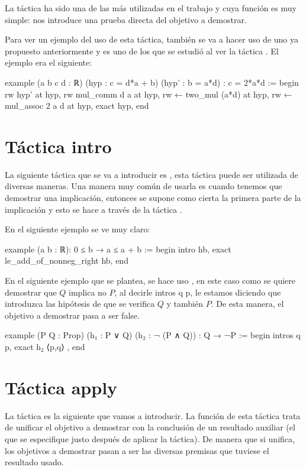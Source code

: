 La táctica  ha sido una de las más utilizadas en
el trabajo y cuya función es muy simple: nos introduce una prueba
directa del objetivo a demostrar.

Para ver un ejemplo del uso de esta táctica, también se va a hacer uso
de uno ya propuesto anteriormente y es uno de los que se estudió al ver
la táctica . El ejemplo era el siguiente:

\begin{leancode}
example (a b c d : ℝ) (hyp : c = d*a + b) (hyp' : b = a*d) : c = 2*a*d :=
begin
  rw hyp' at hyp,
  rw mul_comm d a at hyp,
  rw ← two_mul (a*d) at hyp,
  rw ← mul_assoc 2 a d at hyp,
  exact hyp,
end
\end{leancode}

\section{Táctica intro}

La siguiente táctica que se va a introducir es
, esta táctica puede ser utilizada de
diversas maneras. Una manera muy común de usarla es cuando tenemos que
demostrar una implicación, entonces se supone como cierta la primera
parte de la implicación y esto se hace a través de la táctica
.

En el siguiente ejemplo se ve muy claro:

\begin{leancode}
example (a b : ℝ): 0 ≤ b → a ≤ a + b :=
begin
  intro hb,
  exact le_add_of_nonneg_right hb,
end
\end{leancode}

En el siguiente ejemplo que se plantea, se hace uso
, en este caso como se quiere demostrar
que \(Q\) implica no \(P\), al decirle intros q p, le estamos diciendo
que introduzca las hipótesis de que se verifica \(Q\) y también \(P\).
De esta manera, el objetivo a demostrar pasa a ser false.
\begin{leancode}
example (P Q : Prop) (h₁ : P ∨ Q) (h₂ : ¬ (P ∧ Q)) : Q → ¬P :=
begin
  intros q p,
  exact h₂ ⟨p,q⟩ ,
end
\end{leancode}

\section{Táctica apply}

La táctica  es la siguiente que vamos a
introducir. La función de esta táctica trata de unificar el objetivo a
demostrar con la conclusión de un resultado auxiliar (el que se
especifique justo después de aplicar la táctica). De manera que si
unifica, los objetivos a demostrar pasan a ser las diversas premisas que
tuviese el resultado usado.

